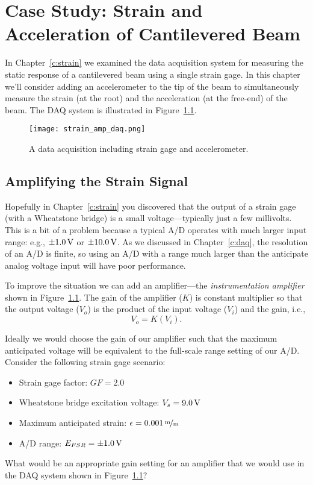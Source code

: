 \chapter{Case Study: Strain and Acceleration of Cantilevered Beam} \label{c:accel}

In Chapter~\ref{c:strain} we examined the data acquisition system for measuring the static response of a cantilevered beam using a single strain gage.  In this chapter we'll consider adding an accelerometer to the tip of the beam to simultaneously measure the strain (at the root) and the acceleration (at the free-end) of the beam.  The DAQ system is illustrated in Figure~\ref{f:strainampdaq}.

\begin{figure}[hbt!]
\centering
\texttt{[image: strain\_amp\_daq.png]}
\caption{A data acquisition including strain gage and accelerometer.}
\label{f:strainampdaq}
\end{figure}

\section{Amplifying the Strain Signal}
Hopefully in Chapter~\ref{c:strain} you discovered that the output of a strain gage (with a Wheatstone bridge) is a small voltage---typically just a few millivolts.  This is a bit of a problem because a typical A/D operates with much larger input range: e.g., $\pm \unit[1.0]{V}$ or $\pm \unit[10.0]{V}$.  As we discussed in Chapter~\ref{c:daq}, the resolution of an A/D is finite, so using an A/D with a range much larger than the anticipate analog voltage input will have poor performance.

To improve the situation we can add an amplifier---the \emph{instrumentation amplifier} shown in Figure~\ref{f:strainampdaq}.  The gain of the amplifier ($K$) is constant multiplier so that the output voltage ($V_o$) is the product of the input voltage ($V_i$) and the gain, i.e.,
\[ V_o = K (V_i). \]

\begin{ex}
Ideally we would choose the gain of our amplifier such that the maximum anticipated voltage will be equivalent to the full-scale range setting of our A/D.  Consider the following strain gage scenario:
\begin{itemize}
\item Strain gage factor: $GF=2.0$
\item Wheatstone bridge excitation voltage: $V_s=\unit[9.0]{V}$
\item Maximum anticipated strain: $\epsilon=\unitfrac[0.001]{m}{m}$
\item A/D range: $E_{FSR}=\pm \unit[1.0]{V}$
\end{itemize}
What would be an appropriate gain setting for an amplifier that we would use in the DAQ system shown in Figure~\ref{f:strainampdaq}?
\end{ex}

